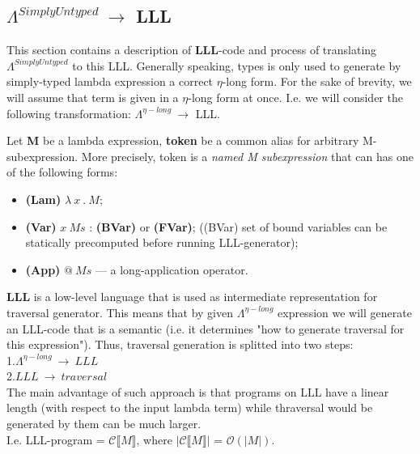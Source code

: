 \documentclass[a4paper, 10pt]{article}
\newcommand\abs[1]{\left|#1\right|}
\begin{document}
\subsection{$\Lambda^{\textit{SimplyUntyped}} \ \rightarrow$ LLL}
This section contains a description of \textbf{LLL}-code and process of translating $\Lambda^{\textit{SimplyUntyped}}$ to this LLL. Generally speaking, types is only used to generate by simply-typed lambda expression a correct $\eta$-long form. For the sake of brevity, we will assume that term is given in a $\eta$-long form at once.
I.e. we will consider the following transformation: $\Lambda^{\eta-long}\ \rightarrow$ LLL.

Let \textbf{M} be a lambda expression, \textbf{token} be a common alias for arbitrary M-subexpression. More precisely, token is a \textit{named M subexpression} that can has one of the following forms:
\begin{itemize}
\item \textbf{(Lam)} $\lambda\ x\ .\ M$;
\item \textbf{(Var)} $x\ Ms$ : \textbf{(BVar)} or \textbf{(FVar)}; ((BVar) set of bound variables can be statically precomputed before running LLL-generator);
\item \textbf{(App)} $@\ Ms$ --- a long-application operator.
\end{itemize}

\textbf{LLL} is a low-level language that is used as intermediate representation for traversal generator. This means that by given $\Lambda^{\eta-long}$ expression we will generate an LLL-code that is a semantic (i.e. it determines "how to generate traversal for this expression"). Thus, traversal generation is splitted into two steps:\\
1.$\Lambda^{\eta-long}\ \rightarrow \ LLL$\\
2.$LLL\ \rightarrow \ traversal$\\
The main advantage of such approach is that
programs on LLL have a linear length (with respect to the input lambda term) while thraversal would be generated by them can be much larger.\\
I.e. LLL-program = $\mathcal{C}\llbracket M \rrbracket$, where $\abs{\mathcal{C}\llbracket M \rrbracket}$ = $\mathcal{O}(\abs{M})$.
\end{document}
